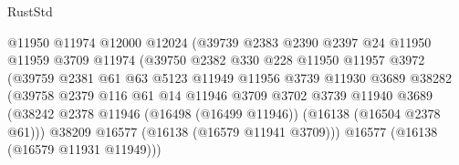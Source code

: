 \begin{lexlean}{RustStd}
\begin{coremodule}
                                      @11950
                                      @11974
                                      @12000
                                      @12024
                                      (@39739
                                        @2383
                                        @2390
                                        @2397
                                        @24
                                        @11950
                                        @11959
                                        @3709
                                        @11974
                                        (@39750
                                          @2382
                                          @330
                                          @228
                                          @11950
                                          @11957
                                          @3972
                                          (@39759
                                            @2381
                                            @61
                                            @63
                                            @5123
                                            @11949
                                            @11956
                                            @3739
                                            @11930
                                            @3689
                                            @38282
                                            (@39758
                                              @2379
                                              @116
                                              @61
                                              @14
                                              @11946
                                              @3709
                                              @3702
                                              @3739
                                              @11940
                                              @3689
                                              (@38242
                                                @2378
                                                @11946
                                                (@16498 (@16499 @11946))
                                                (@16138 (@16504 @2378 @61)))
                                              @38209
                                              @16577
                                              (@16138 (@16579 @11941 @3709)))
                                            @16577
                                            (@16138 (@16579 @11931 @11949)))

\end{coremodule}
\end{lexlean}
